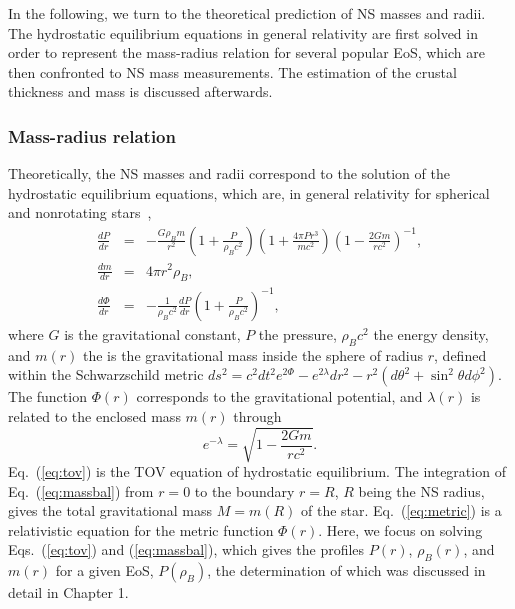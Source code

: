 In the following, we turn to the theoretical prediction of NS masses and radii. 
The hydrostatic equilibrium equations in general relativity are first solved in 
order to represent the mass-radius relation for several popular EoS, which are
then confronted to NS mass measurements. The estimation of the crustal 
thickness and mass is discussed afterwards.

\subsubsection{Mass-radius relation}

Theoretically, the NS masses and radii correspond to the 
solution of the hydrostatic equilibrium equations, which are, in general 
relativity for spherical and nonrotating 
stars~\cite{Tolman1939,Oppenheimer1939},
%
\begin{eqnarray}
  \frac{dP}{dr} &=& -\frac{G\rho_B m}{r^2}\left(1 + \frac{P}{\rho_B
  c^2}\right)\left(1+\frac{4\pi
  Pr^3}{mc^2}\right)\left(1-\frac{2Gm}{rc^2}\right)^{-1},\label{eq:tov}\\
      \frac{dm}{dr} &=& 4\pi r^2\rho_B,\label{eq:massbal}\\
  \frac{d\Phi}{dr} &=& -\frac{1}{\rho_B
    c^2}\frac{dP}{dr}\left(1+\frac{P}{\rho_B
  c^2}\right)^{-1}\label{eq:metric},
\end{eqnarray}
%
where $G$ is the gravitational constant, $P$ the pressure, $\rho_B c^2$ the
energy density, and $m(r)$ the is the gravitational mass inside the sphere of
radius $r$, defined within the Schwarzschild metric $ds^2 = c^2dt^2e^{2\Phi} 
- e^{2\lambda}dr^2 - r^2(d\theta^2 + \sin^2\theta d\phi^2)$. The function 
$\Phi(r)$ corresponds to the gravitational potential, and $\lambda(r)$ is 
related to the enclosed mass $m(r)$ through
%
\begin{equation}
  e^{-\lambda} = \sqrt{1-\frac{2Gm}{rc^2}}.
\end{equation}
%
Eq.~(\ref{eq:tov}) is the TOV equation 
of hydrostatic equilibrium. The integration of Eq.~(\ref{eq:massbal}) from
$r=0$ to the boundary $r=R$, $R$ being the NS radius, gives the total
gravitational mass $M=m(R)$ of the star. Eq.~(\ref{eq:metric}) is a 
relativistic equation for the metric function $\Phi(r)$. Here, we focus on 
solving Eqs.~(\ref{eq:tov}) and 
(\ref{eq:massbal}), which gives the profiles $P(r)$, $\rho_B(r)$, and $m(r)$ 
for a given EoS, $P(\rho_B)$, the determination of which was discussed in 
detail in Chapter 1.

